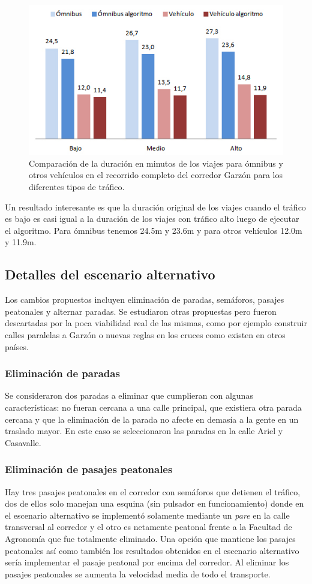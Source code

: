 \begin{figure}[H]
	\centering
	\includegraphics[width=0.8\linewidth]{Figures/duracion_viajes}
	\caption{Comparación de la duración en minutos de los viajes para ómnibus y otros vehículos en el recorrido completo del corredor Garzón para los diferentes tipos de tráfico.}
	\label{fig:duracion_viajes}
\end{figure}

Un resultado interesante es que la duración original de los viajes cuando el tráfico es bajo es casi igual a la duración de los viajes con tráfico alto luego de ejecutar el algoritmo.
Para ómnibus tenemos 24.5m y 23.6m y  para otros vehículos 12.0m y 11.9m.

\subsection{Detalles del escenario alternativo}
Los cambios propuestos incluyen eliminación de paradas, semáforos, pasajes peatonales y alternar paradas. Se estudiaron otras propuestas pero fueron descartadas por la poca viabilidad real de las mismas, como por ejemplo construir calles paralelas a Garzón o nuevas reglas en los cruces como existen en otros países.

\subsubsection{Eliminación de paradas}
Se consideraron dos paradas a eliminar que cumplieran con algunas características: no fueran cercana a una calle principal, que existiera otra parada cercana y que la eliminación de la parada no afecte en demasía a la gente en un traslado mayor.
En este caso se seleccionaron las paradas en la calle Ariel y Casavalle.

\subsubsection{Eliminación de pasajes peatonales}
Hay tres pasajes peatonales en el corredor con semáforos que detienen el tráfico, dos de ellos solo manejan una esquina (sin pulsador en funcionamiento) donde en el escenario alternativo se implementó solamente mediante un \emph{pare} en la calle transversal al corredor y el otro es netamente peatonal frente a la Facultad de Agronomía que fue totalmente eliminado. Una opción que mantiene los pasajes peatonales así como también los resultados obtenidos en el escenario alternativo sería implementar el pasaje peatonal por encima del corredor. Al eliminar los pasajes peatonales se aumenta la velocidad media de todo el transporte.

